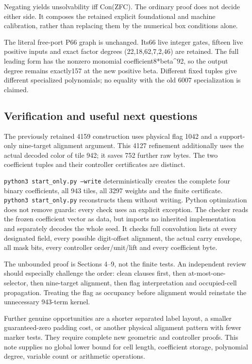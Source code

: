 Negating yields unsolvability iff Con(ZFC). The ordinary proof does not decide either side. It composes the retained explicit foundational and machine calibration, rather than replacing them by the numerical box conditions alone.

The literal free-port P66 graph is unchanged. Its66 live integer gates, fifteen live positive inputs and exact factor degrees (22,18,62,7,2,46) are retained. The full leading form has the nonzero monomial coefficient8*beta\textasciicircum{}92, so the output degree remains exactly157 at the new positive beta. Different fixed tuples give different specialized polynomials; no equality with the old 6007 specialization is claimed.

\subsection{Verification and useful next questions}
The previously retained 4159 construction uses physical flag 1042 and a support-only nine-target alignment argument. This 4127 refinement additionally uses the actual decoded color of tile 942; it saves 752 further raw bytes. The two coefficient tuples and their controller certificates are distinct.

\texttt{python3 start\_only.py --write} deterministically creates the complete four binary coefficients, all 943 tiles, all 3297 weights and the finite certificate. \texttt{python3 start\_only.py} reconstructs them without writing. Python optimization does not remove guards: every check uses an explicit exception. The checker reads the frozen coefficient vector as data, but imports no inherited implementation and separately decodes the whole seed. It checks full convolution lists at every designated field, every possible digit-offset alignment, the actual carry envelope, all mask bits, every controller order/unit/lift and every coefficient byte.

The unbounded proof is Sections 4--9, not the finite tests. An independent review should especially challenge the order: clean clauses first, then at-most-one-selector, then nine-target alignment, then flag interpretation and occupied-cell propagation. Treating the flag as occupancy before alignment would reinstate the unnecessary 943-term kernel.

Further genuine opportunities are a shorter separated label layout, a smaller guaranteed-zero padding cost, or another physical alignment pattern with fewer marker tests. They require complete new geometric and controller proofs. This note supplies no global lower bound for cell length, coefficient storage, polynomial degree, variable count or arithmetic operations.
